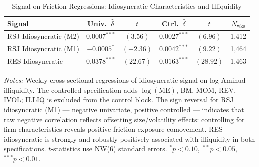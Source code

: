 \documentclass[11pt,a4paper]{article}
\begin{document}
\begin{table}[!htbp]
\centering
\caption{Signal-on-Friction Regressions: Idiosyncratic Characteristics and Illiquidity}
\label{tab:frictions_signal}
\small
\begin{threeparttable}
\begin{tabular}{l c c c c c}
\toprule
Signal
  & Univ.\ $\hat\delta$ & $t$ & Ctrl.\ $\hat\delta$ & $t$ & $N_{\text{wks}}$ \\
\midrule
RSJ Idiosyncratic (M2)
  & $0.0007^{***}$ & $(3.56)$ & $0.0027^{***}$ & $(6.96)$ & 1{,}412 \\[2pt]
RSJ Idiosyncratic (M1)
  & $-0.0005^{*}$ & $(-2.36)$ & $0.0042^{***}$ & $(9.22)$ & 1{,}464 \\[2pt]
RES Idiosyncratic
  & $0.0378^{***}$ & $(22.67)$ & $0.0163^{***}$ & $(28.92)$ & 1{,}463 \\
\bottomrule
\end{tabular}
\begin{tablenotes}
\footnotesize
\item \textit{Notes:} Weekly cross-sectional regressions of idiosyncratic signal on
log-Amihud illiquidity. The controlled specification adds $\log(\text{ME})$, BM, MOM,
REV, IVOL; ILLIQ is excluded from the control block. The sign reversal for RSJ
idiosyncratic (M1) --- negative univariate, positive controlled --- indicates that raw
negative correlation reflects offsetting size/volatility effects: controlling for firm
characteristics reveals positive friction-exposure comovement. RES idiosyncratic is
strongly and robustly positively associated with illiquidity in both specifications.
$t$-statistics use NW(6) standard errors.
$^{*}p<0.10$,\ $^{**}p<0.05$,\ $^{***}p<0.01$.
\end{tablenotes}
\end{threeparttable}
\end{table}

\clearpage


\end{document}
